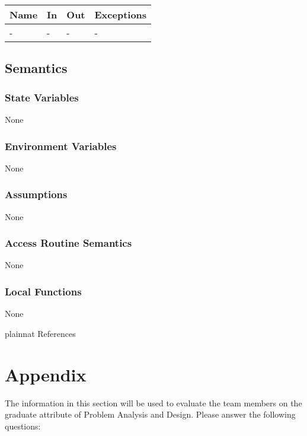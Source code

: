 \documentclass[12pt, titlepage]{article}
\begin{document}
\begin{center}
\begin{tabular}{p{2cm} p{4cm} p{4cm} p{2cm}}
\hline
\textbf{Name} & \textbf{In} & \textbf{Out} & \textbf{Exceptions} \\
\hline
- & - & - & - \\
\hline
\end{tabular}
\end{center}

\subsection{Semantics}

\subsubsection{State Variables}

None

\subsubsection{Environment Variables}

None

\subsubsection{Assumptions}

None

\subsubsection{Access Routine Semantics}

None

\subsubsection{Local Functions}

None

\newpage


 {plainnat}
 {References}

\newpage

\section{Appendix} \label{Appendix}


The information in this section will be used to evaluate the team members on the
graduate attribute of Problem Analysis and Design.  Please answer the following questions:
\end{document}
